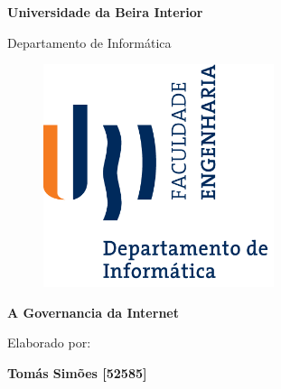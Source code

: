 \thispagestyle{empty}
\setcounter{page}{-1}

\begin{center}
  \begin{Huge}
    \textbf{Universidade da Beira Interior}
  \end{Huge}
\end{center}

\begin{center}
  \begin{Huge}
    Departamento de Informática
  \end{Huge}
\end{center}

\vspace{0,07cm}
\begin{figure}[!htb]
  \centering
  \includegraphics[width=191pt]{images/ubi-fe-di.png}
\end{figure}

\vspace{0.5cm}
\begin{center}
  \begin{Large}
    \textbf{A Governancia da Internet}
  \end{Large}
\end{center}


\vspace{0.5cm}
\begin{center}
  \begin{normalsize}
    \begin{large}
      Elaborado por:
    \end{large}
  \end{normalsize}
\end{center}

\vspace{0.2cm}
\begin{center}
  \begin{large}
    \textbf{Tomás Simões [52585]}
  \end{large}
\end{center}

